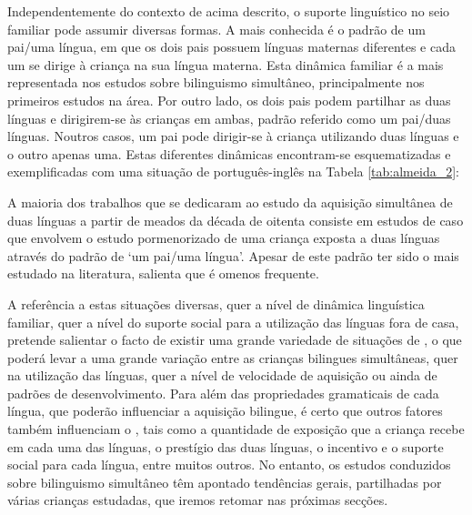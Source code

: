 \documentclass[output=paper]{LSP/langsci}
\begin{document}
Independentemente do contexto de  acima descrito, o suporte linguístico no seio familiar pode assumir diversas formas. A mais conhecida é o padrão de um pai/uma língua, em que os dois pais possuem línguas maternas diferentes e cada um se dirige à criança na sua língua materna. Esta dinâmica familiar é a mais representada nos estudos sobre bilinguismo simultâneo, principalmente nos primeiros estudos na área. Por outro lado, os dois pais podem partilhar as duas línguas e dirigirem-se às crianças em ambas, padrão referido como um pai/duas línguas. Noutros casos, um pai pode dirigir-se à criança utilizando duas línguas e o outro apenas uma. Estas diferentes dinâmicas encontram-se esquematizadas e exemplificadas com uma situação de  português-inglês na Tabela \ref{tab:almeida_2}:

\begin{table}[h]
\centering
{}
\caption{Padrões de contacto com as línguas dos pais em situação de bilinguismo}
\label{tab:almeida_2}
\end{table}

A maioria dos trabalhos que se dedicaram ao estudo da aquisição simultânea de duas línguas a partir de meados da década de oitenta consiste em estudos de caso que envolvem o estudo pormenorizado de uma criança exposta a duas línguas através do padrão de `um pai/uma língua'. Apesar de este padrão ter sido o mais estudado na literatura, \citet{dehouwer2009} salienta que é o\largerpage menos frequente.

A referência a estas situações diversas, quer a nível de dinâmica linguística familiar, quer a nível do suporte social para a utilização das línguas fora de casa, pretende salientar o facto de existir uma grande variedade de situações de , o que poderá levar a uma grande variação entre as crianças bilingues simultâneas, quer na utilização das línguas, quer a nível de velocidade de aquisição ou ainda de padrões de desenvolvimento. Para além das propriedades gramaticais de cada língua, que poderão influenciar a aquisição bilingue, é certo que outros fatores também influenciam o , tais como a quantidade de exposição que a criança recebe em cada uma das línguas, o prestígio das duas línguas, o incentivo e o suporte social para cada língua, entre muitos outros. No entanto, os estudos conduzidos sobre bilinguismo simultâneo  têm apontado tendências gerais, partilhadas por várias crianças estudadas, que iremos retomar nas próximas secções. 
\end{document}
